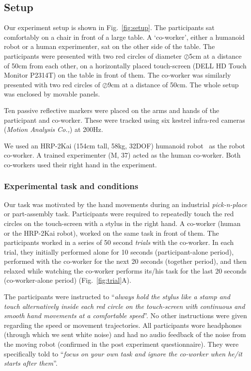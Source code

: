 \documentclass[a4paper, 12pt, oneside]{Thesis}  %
\begin{document}
\subsection{Setup}

Our experiment setup is shown in Fig.~\ref{fig:setup}. The participants sat comfortably on a chair in front of a large table. A `co-worker', either a humanoid robot or a human experimenter, sat on the other side of the table. The participants were presented with two red circles of diameter $\oslash$5cm at a distance of 50cm from each other, on a horizontally placed touch-screen (DELL HD Touch Monitor P2314T) on the table in front of them. The co-worker was similarly presented with two red circles of $\oslash$9cm at a distance of 50cm. The whole setup was enclosed by movable panels.

Ten passive reflective markers were placed on the arms and hands of the participant and co-worker. These were tracked using six kestrel infra-red cameras ({\it Motion Analysis Co.,}) at 200Hz.

We used an HRP-2Kai (154cm tall, 58kg, 32DOF) humanoid robot~\cite{Kaneko:RAS_ICHR:2015} as the robot co-worker. A trained experimenter (M, 37) acted as the human co-worker. Both co-workers used their right hand in the experiment.

\subsubsection{Experimental task and conditions}

Our task was motivated by the hand movements during an industrial {\it pick-n-place} or part-assembly task. Participants were required to repeatedly touch the red circles on the touch-screen with a stylus in the right hand. A co-worker (human or the HRP-2Kai robot), worked on the same task in front of them. The participants worked in a series of 50 second \textit{trials} with the co-worker. In each trial, they initially performed alone for 10 seconds (participant-alone period), performed with the co-worker for the next 20 seconds (together period), and then relaxed while watching the co-worker performs its/his task for the last 20 seconds (co-worker-alone period) (Fig.~\ref{fig:trial}A).

The participants were instructed to ``{\it always hold the stylus like a stamp and touch alternatively inside each red circle on the touch-screen with continuous and smooth hand movements at a comfortable speed}''. No other instructions were given regarding the speed or movement trajectories. All participants wore headphones (through which we sent white noise) and had no audio feedback of the noise from the moving robot (confirmed in the post experiment questionnaire). They were specifically told to ``{\it focus on your own task and ignore the co-worker when he/it starts after them}''.
\end{document}
